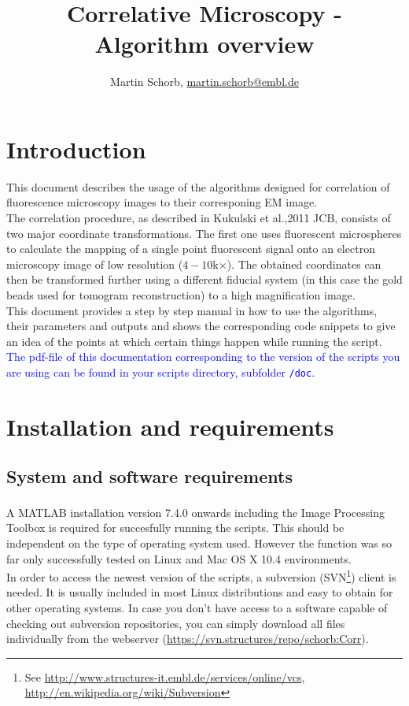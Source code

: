 \documentclass[10pt,a4paper,onepage,DIV12]{scrartcl}
\title{Correlative Microscopy - Algorithm overview}
\author{Martin Schorb, \href{mailto:martin.schorb@embl.de}{martin.schorb@embl.de}}
\begin{document}
\maketitle
\tableofcontents
 \newpage
\section{Introduction}
This document describes the usage of the algorithms designed for correlation of fluorescence microscopy images to their corresponing EM image.\\

The correlation procedure, as described in Kukulski et al.,2011 JCB, consists of two major coordinate transformations. The first one uses fluorescent microspheres to calculate the mapping of a single point fluorescent signal onto an electron microscopy image of low resolution ($4-10 $k$\times$). The obtained coordinates can then be transformed further using a different fiducial system (in this case the gold beads used for tomogram reconstruction) to a high magnification image.\\

This document provides a step by step manual in how to use the algorithms, their parameters and outputs and shows the corresponding code snippets to give an idea of the points at which certain things happen while running the script.\\

\textcolor{blue}{The pdf-file of this documentation corresponding to the version of the scripts you are using can be found in your scripts directory, subfolder \texttt{/doc}.}
\section{Installation and requirements}

\subsection{System and software requirements}A MATLAB\textsuperscript{\textregistered} 
installation version 7.4.0 onwards including the Image Processing Toolbox is required for succesfully running the scripts. This should be independent on the type of operating system used. However the function was so far only successfully tested on Linux and Mac OS X 10.4  environments. 
\\

In order to access the newest version of the scripts, a subversion (SVN\footnote{See \url{http://www.structures-it.embl.de/services/online/vcs},\; \url{http://en.wikipedia.org/wiki/Subversion}}) client is needed. It is usually included in most Linux distributions and easy to obtain for other operating systems. In case you don't have access to a software capable of checking out subversion repositories, you can simply download all files individually from the webserver (\url{https://svn.structures/repo/schorb:Corr}).
\end{document}
